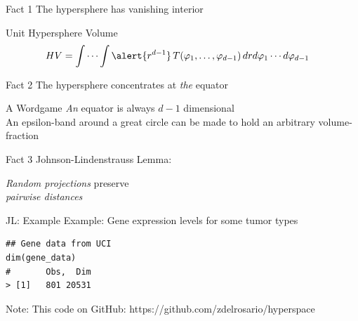 \documentclass[14pt]{beamer}
\begin{document}
\begin{frame}{Fact 1}
  The hypersphere has vanishing interior
\end{frame}

\begin{frame}{Unit Hypersphere Volume}
  \begin{equation*} \begin{aligned}
      HV &= \int\cdots\int \alert{r^{d-1}}\,
           T(\varphi_{1},\dots,\varphi_{d-1})\,
           dr d\varphi_{1}\cdots d\varphi_{d-1}
  \end{aligned} \end{equation*}
\end{frame}


\begin{frame}{Fact 2}
  The hypersphere concentrates at \emph{the} equator
\end{frame}


\begin{frame}{A Wordgame}
  \emph{An} equator is always $d-1$ dimensional \\

  \bigskip An epsilon-band around a great circle can be made to hold an
  arbitrary volume-fraction
\end{frame}


\begin{frame}{Fact 3}
  Johnson-Lindenstrauss Lemma:

  \bigskip \emph{Random projections} preserve \\
  \emph{pairwise distances}
\end{frame}

\begin{frame}[fragile]{JL: Example}
Example: Gene expression levels for some tumor types

\bigskip
  \begin{lstlisting}
## Gene data from UCI
dim(gene_data)
#       Obs,  Dim
> [1]   801 20531
  \end{lstlisting}

  \bigskip
  Note: This code on GitHub: https://github.com/zdelrosario/hyperspace
\end{frame}
\end{document}
